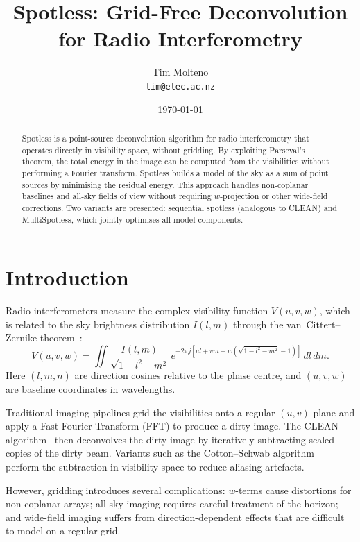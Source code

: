 \documentclass[a4paper,11pt]{article}
\title{Spotless: Grid-Free Deconvolution\\for Radio Interferometry}
\author{Tim Molteno\\
\texttt{tim@elec.ac.nz}}
\date{\today}
\begin{document}
\maketitle

\begin{abstract}
	Spotless is a point-source deconvolution algorithm for radio interferometry
	that operates directly in visibility space, without gridding. By exploiting
	Parseval's theorem, the total energy in the image can be computed from the
	visibilities without performing a Fourier transform. Spotless builds a model
	of the sky as a sum of point sources by minimising the residual energy. This
	approach handles non-coplanar baselines and all-sky fields of view without
	requiring $w$-projection or other wide-field corrections. Two variants are
	presented: sequential spotless (analogous to CLEAN) and MultiSpotless, which
	jointly optimises all model components.
\end{abstract}

\section{Introduction}

Radio interferometers measure the complex visibility function
$V(u, v, w)$, which is related to the sky brightness distribution
$I(l, m)$ through the van~Cittert--Zernike theorem~\cite{thompson2017}:
%
\begin{equation}
	V(u, v, w) = \iint \frac{I(l, m)}{\sqrt{1 - l^2 - m^2}}
	\, e^{-2\pi j [ul + vm + w(\sqrt{1-l^2-m^2} - 1)]}
	\, dl \, dm.
	\label{eq:vcz}
\end{equation}
%
Here $(l, m, n)$ are direction cosines relative to the phase centre, and
$(u, v, w)$ are baseline coordinates in wavelengths.

Traditional imaging pipelines grid the visibilities onto a regular
$(u,v)$-plane and apply a Fast Fourier Transform (FFT) to produce a
dirty image. The CLEAN algorithm~\cite{hogbom1974} then deconvolves the
dirty image by iteratively subtracting scaled copies of the dirty beam.
Variants such as the Cotton--Schwab algorithm~\cite{schwab1984} perform
the subtraction in visibility space to reduce aliasing artefacts.

However, gridding introduces several complications: $w$-terms cause
distortions for non-coplanar arrays; all-sky imaging requires careful
treatment of the horizon; and wide-field imaging suffers from
direction-dependent effects that are difficult to model on a
regular grid.
\end{document}
